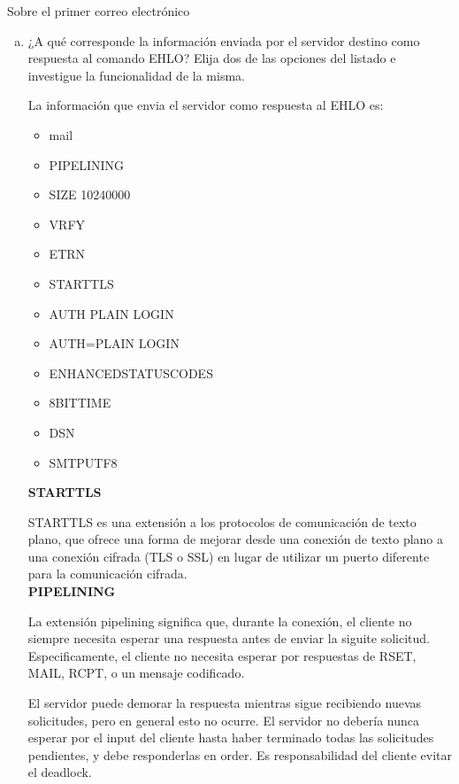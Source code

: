\documentclass[osajnl,twocolumn,showpacs,superscriptaddress,10pt]{revtex4-1} %
\begin{document}
Sobre el primer correo electrónico \\

\begin{enumerate}[a)]
  \item ¿A qué corresponde la información enviada por el servidor destino como respuesta al comando EHLO? Elija dos de las opciones del listado e investigue la funcionalidad de la misma.

  La información que envia el servidor como respuesta al EHLO es:

  \begin{itemize}
    \item mail
    \item PIPELINING
    \item SIZE 10240000
    \item VRFY
    \item ETRN
    \item STARTTLS
    \item AUTH PLAIN LOGIN
    \item AUTH=PLAIN LOGIN
    \item ENHANCEDSTATUSCODES
    \item 8BITTIME
    \item DSN
    \item SMTPUTF8
  \end{itemize}
  
  \textbf{STARTTLS}
  
  STARTTLS es una extensión a los protocolos de comunicación de texto plano, que ofrece una forma de mejorar desde una conexión de texto plano a una conexión cifrada (TLS o SSL) en lugar de utilizar un puerto diferente para la comunicación cifrada. \\
  
  \textbf{PIPELINING}
  
  La extensión pipelining significa que, durante la conexión, el cliente no siempre necesita esperar una respuesta antes de enviar la siguite solicitud. Especificamente, el cliente no necesita esperar por respuestas de RSET, MAIL, RCPT, o un mensaje codificado.
  
  El servidor puede demorar la respuesta mientras sigue recibiendo nuevas solicitudes, pero en general esto no ocurre. El servidor no debería nunca esperar por el input del cliente hasta haber terminado todas las solicitudes pendientes, y debe responderlas en order. Es responsabilidad del cliente evitar el deadlock. \\
  

\end{enumerate}
\end{document}
